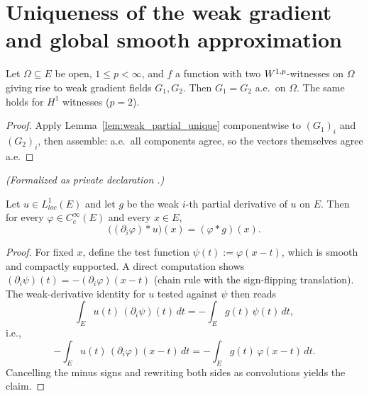 \section{Uniqueness of the weak gradient and global smooth approximation}

\begin{theorem}
\label{thm:weak_grad_unique}
\leanok
{}
Let $\Omega \subseteq E$ be open, $1 \le p < \infty$, and $f$ a function with
two $W^{1,p}$-witnesses on $\Omega$ giving rise to weak gradient fields
$G_1, G_2$. Then $G_1 = G_2$ a.e.\ on $\Omega$. The same holds for $H^1$
witnesses ($p = 2$).
\end{theorem}

\begin{proof}
\leanok
{}

Apply Lemma~\ref{lem:weak_partial_unique} componentwise to $(G_1)_i$ and
$(G_2)_i$, then assemble: a.e.\ all components agree, so the vectors
themselves agree a.e.
\end{proof}

\begin{lemma}
\label{lem:conv_fderiv_weak_partial}
\leanok
{}
\noindent\textit{(Formalized as private declaration .)}\par
Let $u \in L^1_{loc}(E)$ and let $g$ be the weak $i$-th partial derivative of
$u$ on $E$. Then for every $\varphi \in C_c^\infty(E)$ and every $x \in E$,
\begin{equation*}
  \bigl((\partial_i\varphi) * u\bigr)(x) = (\varphi * g)(x).
\end{equation*}
\end{lemma}

\begin{proof}
\leanok

For fixed $x$, define the test function $\psi(t) := \varphi(x - t)$, which is
smooth and compactly supported. A direct computation shows
$(\partial_i \psi)(t) = -(\partial_i\varphi)(x - t)$ (chain rule with the
sign-flipping translation). The weak-derivative identity for $u$ tested against
$\psi$ then reads
\begin{equation*}
  \int_E u(t)\,(\partial_i\psi)(t)\,dt = -\int_E g(t)\,\psi(t)\,dt,
\end{equation*}
i.e.,
\begin{equation*}
  -\int_E u(t)\,(\partial_i\varphi)(x - t)\,dt = -\int_E g(t)\,\varphi(x - t)\,dt.
\end{equation*}
Cancelling the minus signs and rewriting both sides as convolutions yields the
claim.
\end{proof}

